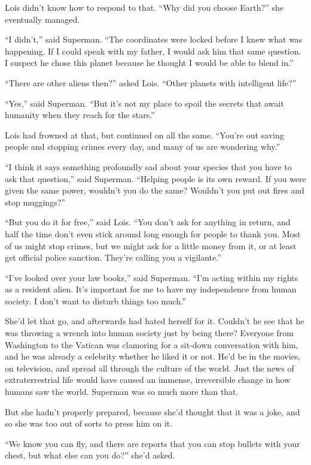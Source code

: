 \documentclass[ebook,12pt]{memoir}
\begin{document}
Lois didn't know how to respond to that. ``Why did you choose Earth?''
she eventually managed.

``I didn't,'' said Superman. ``The coordinates were locked before I knew
what was happening. If I could speak with my father, I would ask him
that same question. I suspect he chose this planet because he thought I
would be able to blend in.''

``There are other aliens then?'' asked Lois. ``Other planets with
intelligent life?''

``Yes,'' said Superman. ``But it's not my place to spoil the secrets
that await humanity when they reach for the stars.''

Lois had frowned at that, but continued on all the same. ``You're out
saving people and stopping crimes every day, and many of us are
wondering why.''

``I think it says something profoundly sad about your species that you
have to ask that question,'' said Superman. ``Helping people is its own
reward. If you were given the same power, wouldn't you do the same?
Wouldn't you put out fires and stop muggings?''

``But you do it for free,'' said Lois. ``You don't ask for anything in
return, and half the time don't even stick around long enough for people
to thank you. Most of us might stop crimes, but we might ask for a
little money from it, or at least get official police sanction. They're
calling you a vigilante.''

``I've looked over your law books,'' said Superman. ``I'm acting within
my rights as a resident alien. It's important for me to have my
independence from human society. I don't want to disturb things too
much.''

She'd let that go, and afterwards had hated herself for it. Couldn't he
see that he was throwing a wrench into human society just by being
there? Everyone from Washington to the Vatican was clamoring for a
sit‐down conversation with him, and he was already a celebrity whether
he liked it or not. He'd be in the movies, on television, and spread all
through the culture of the world. Just the news of extraterrestrial life
would have caused an immense, irreversible change in how humans saw the
world. Superman was so much more than that.

But she hadn't properly prepared, because she'd thought that it was a
joke, and so she was too out of sorts to press him on it.

``We know you can fly, and there are reports that you can stop bullets
with your chest, but what else can you do?'' she'd asked.
\end{document}
